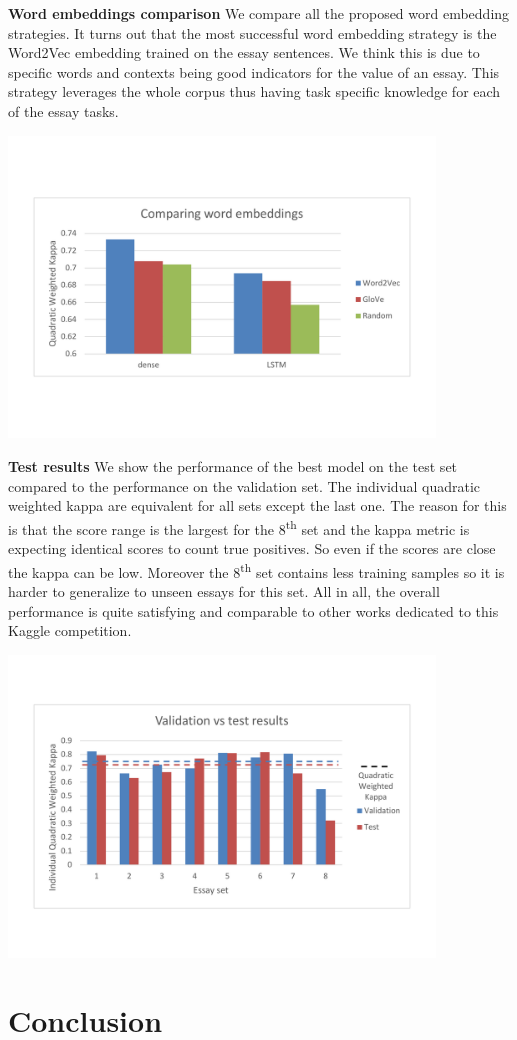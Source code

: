 \documentclass[a4paper,12pt,english]{article}
\newcommand{\TODO}{\fbox{\textcolor{red}{TODO}}}
\begin{document}
\textbf{Word embeddings comparison} We compare all the proposed word embedding strategies. It turns out that the most successful word embedding strategy is the Word2Vec embedding trained on the essay sentences. We think this is due to specific words and contexts being good indicators for the value of an essay. This strategy leverages the whole corpus thus having task specific knowledge for each of the essay tasks.

\begin{center}
\vspace*{-1.5cm}
\includegraphics[width=0.85\textwidth]{fig/word_embeddings.pdf}
\vspace*{-1.5cm}
\end{center}

\textbf{Test results} We show the performance of the best model on the test set compared to the performance on the validation set. The individual quadratic weighted kappa are equivalent for all sets except the last one. The reason for this is that the score range is the largest for the 8\textsuperscript{th} set and the kappa metric is expecting identical scores to count true positives. So even if the scores are close the kappa can be low. Moreover the 8\textsuperscript{th} set contains less training samples so it is harder to generalize to unseen essays for this set. All in all, the overall performance is quite satisfying and comparable to other works dedicated to this Kaggle competition.

\begin{center}
\vspace*{-1.5cm}
\includegraphics[width=0.85\textwidth]{fig/test.pdf}
\vspace*{-1.5cm}
\end{center}

\section{Conclusion}
\TODO{}

 

\end{document}

